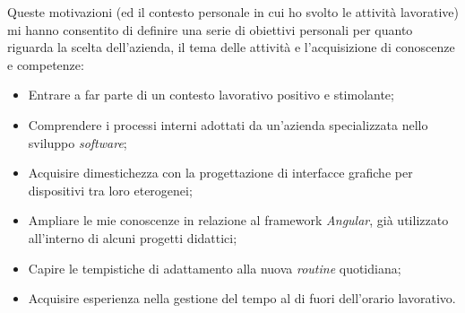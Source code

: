 Queste motivazioni (ed il contesto personale in cui ho svolto le attività lavorative) mi hanno consentito di definire una serie di obiettivi personali per quanto riguarda la scelta dell'azienda, il tema delle attività e l'acquisizione di conoscenze e competenze:
\begin{itemize}
    \item Entrare a far parte di un contesto lavorativo positivo e stimolante;
    \item Comprendere i processi interni adottati da un'azienda specializzata nello sviluppo \textit{software}; 
    \item Acquisire dimestichezza con la progettazione di interfacce grafiche per dispositivi tra loro eterogenei;
    \item Ampliare le mie conoscenze in relazione al framework \textit{Angular}, già utilizzato all'interno di alcuni progetti didattici;
    \item Capire le tempistiche di adattamento alla nuova \textit{routine} quotidiana;
    \item Acquisire esperienza nella gestione del tempo al di fuori dell'orario lavorativo.
\end{itemize}